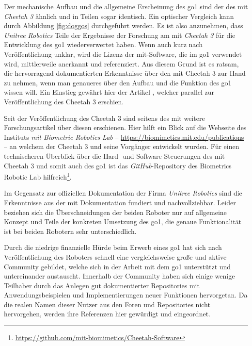 Der mechanische Aufbau und die allgemeine Erscheinung des \gls{go1} sind der des \gls{mit} \emph{Cheetah \num{3}} ähnlich
und in Teilen sogar identisch.
Ein optischer Vergleich kann durch Abbildung \ref{fig:doggos} durchgeführt werden.
Es ist also anzunehmen, dass \emph{Unitree Robotics} Teile der Ergebnisse der Forschung am \gls{mit} \emph{Cheetah \num{3}}
für die Entwicklung des \gls{go1} wiederverwertet haben.
Wenn auch kurz nach Veröffentlichung unklar, wird die Lizenz der \gls{mit}-Software, die im \gls{go1} verwendet wird,
mittlerweile anerkannt und referenziert.
Aus diesem Grund ist es ratsam, die hervorragend dokumentierten Erkenntnisse über den \gls{mit} Cheetah \num{3} zur Hand zu
nehmen, wenn man genaueres über den Aufbau und die Funktion des \gls{go1} wissen will.
Ein Einstieg gewährt hier der Artikel , welcher parallel zur Veröffentlichung des Cheetah \num{3}
erschien.

Seit der Veröffentlichung des Cheetah \num{3} sind seitens des \gls{mit} weitere Forschungsartikel über diesen erschienen.
Hier hilft ein Blick auf die Webseite des Instituts \emph{\gls{mit} Biometric Robotics Lab} -- \url{https://biomimetics.mit.edu/publications} --
an welchem der Cheetah \num{3} und seine Vorgänger entwickelt wurden.
Für einen technischeren Überblick über die Hard- und Software-Steuerungen des \gls{mit} Cheetah 3 und somit auch des \gls{go1}
ist das \emph{GitHub}-Repository des Biometrics Robotic Lab hilfreich\footnote{\url{https://github.com/mit-biomimetics/Cheetah-Software}}.

Im Gegensatz zur offiziellen Dokumentation der Firma \emph{Unitree Robotics} sind die Erkenntnisse aus der \gls{mit}
Dokumentation fundiert und nachvollziehbar.
Leider beziehen sich die Überschneidungen der beiden Roboter nur auf allgemeine Konzept und Teile der konkreten Umsetzung des
\gls{go1}, die genaue Funktionalität ist bei beiden Robotern sehr unterschiedlich.


\noindent Durch die niedrige finanzielle Hürde beim Erwerb eines \gls{go1} hat sich nach Veröffentlichung des Roboters schnell eine
vergleichsweise große und aktive Community gebildet, welche sich in der Arbeit mit dem \gls{go1} unterstützt und untereinander
austauscht.
Innerhalb der Community haben sich einige wenige Teilhaber durch das Anlegen gut dokumentierter Repositories mit Anwendungsbeispielen
und Implementierungen neuer Funktionen hervorgetan.
Da die realen Namen dieser Nutzer aus den Foren und Repositories nicht hervorgehen, werden ihre Referenzen hier gewürdigt
und eingeordnet.

